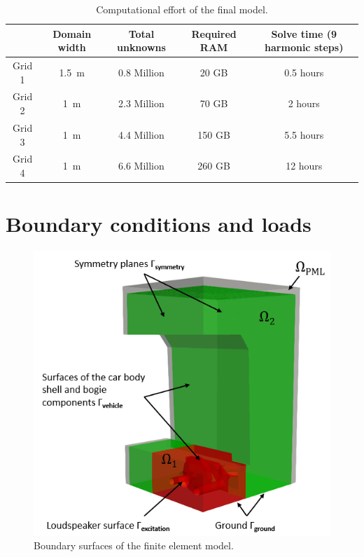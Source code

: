 \begin{table}[H]
	\centering
	\caption{Computational effort of the final model.}
	\label{tab:computational_effort}
	\begin{tabular}{ccccc}
		\toprule
		& Domain width & Total unknowns & Required RAM & Solve time (9 harmonic steps) \\
		\midrule
		Grid 1 & \SI{1.5}{\meter} & 0.8 Million & 20 GB & 0.5 hours \\
		Grid 2 & \SI{1}{\meter} & 2.3 Million & 70 GB & 2 hours \\
		Grid 3 & \SI{1}{\meter} & 4.4 Million & 150 GB & 5.5 hours \\
		Grid 4 & \SI{1}{\meter} & 6.6 Million & 260 GB & 12 hours \\
		\bottomrule
	\end{tabular}
\end{table}



\newpage
\section{Boundary conditions and loads}
\label{section:boundary_conditions}

\begin{figure}
	\centering
	\includegraphics{fig/chap4/region_labels.png}
	\caption{Boundary surfaces of the finite element model.}
	\label{fig:boundary_conditions}
\end{figure}

